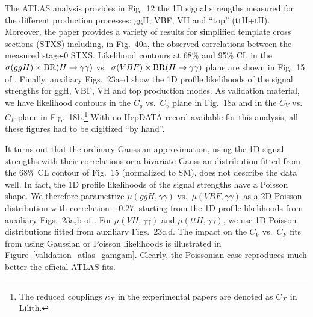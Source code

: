 The ATLAS analysis \cite{Aaboud:2018xdt} provides in Fig.~12 the 1D signal strengths measured for the different production processes:  
ggH, VBF, VH and ``top'' (ttH+tH). Moreover, the paper provides a variety of results for simplified template cross sections (STXS) 
including, in Fig.~40a, the observed correlations between the measured stage-0 STXS. 
Likelihood contours at 68\% and 95\% CL in the $\sigma(ggH)\times {\rm BR}(H\to\gamma\gamma)$ vs.\ 
$\sigma(VBF)\times {\rm BR}(H\to\gamma\gamma)$ plane are shown in Fig.~15 of \cite{Aaboud:2018xdt}. 
Finally, auxiliary Figs.~23a--d show the 1D profile likelihoods of the signal strengths for ggH, VBF, VH and top production modes.
As validation material, we have likelihood contours in the $C_g$ vs.\ $C_\gamma$ plane in Fig.~18a and in the $C_V$ vs.\ $C_F$ plane in Fig.~18b.\footnote{The reduced couplings $\kappa_X$ in the experimental papers are denoted as $C_X$ in Lilith.}
With no HepDATA record available for this analysis, all these figures had to be digitized ``by hand''.

It turns out that the ordinary Gaussian approximation, using the 1D signal strengths with their correlations or 
a bivariate Gaussian distribution fitted from the 68\% CL contour of Fig.~15 (normalized to SM), does not describe the data well.
In fact, the 1D profile likelihoods of the signal strengths have a Poisson shape. 
We therefore parametrize $\mu(ggH,\gamma\gamma)$ vs.\ $\mu(VBF,\gamma\gamma)$ as a 2D Poisson distribution with correlation $-0.27$,  starting from the 1D profile likelihoods from auxiliary Figs.~23a,b of \cite{Aaboud:2018xdt}. For $\mu(VH,\gamma\gamma)$ and $\mu(ttH,\gamma\gamma)$, we use 1D Poisson distributions fitted from auxiliary Figs.~23c,d. 
The impact on the $C_V$ vs.\ $C_F$ fits from using Gaussian or Poisson likelihoods is illustrated 
in Figure~\ref{validation_atlas_gamgam}. Clearly, the Poissonian case reproduces much better the official ATLAS fits. 

 
